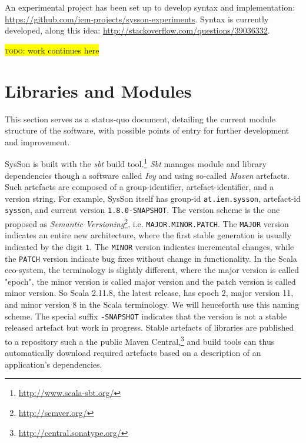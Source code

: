 \documentclass[11pt,a4paper]{article}
\newcommand{\todo}[1]{\colorbox{yellow}{\textsc{todo}: #1}}
\newcommand{\software}[1]{\textit{#1}}
\newcommand{\sysson}[0]{SysSon}
\begin{document}
An experimental project has been set up to develop syntax and implementation: \url{https://github.com/iem-projects/sysson-experiments}. Syntax is currently developed, along this idea: \url{http://stackoverflow.com/questions/39036332}.

\todo{work continues here}

\section{Libraries and Modules}

This section serves as a status-quo document, detailing the current module structure of the software, with possible points of entry for further development and improvement.

\sysson{} is built with the \software{sbt} build tool.\footnote{\url{http://www.scala-sbt.org/}} \software{Sbt} manages module and library dependencies though a software called \software{Ivy} and using so-called \software{Maven} artefacts. Such artefacts are composed of a group-identifier, artefact-identifier, and a version string. For example, \sysson{} itself has group-id \verb!at.iem.sysson!, artefact-id \verb!sysson!, and current version \verb!1.8.0-SNAPSHOT!. The version scheme is the one proposed as \emph{Semantic Versioning}\footnote{\url{http://semver.org/}}, i.e. \verb!MAJOR.MINOR.PATCH!. The \verb!MAJOR! version indicates an entire new architecture, where the first stable generation is usually indicated by the digit \verb!1!. The \verb!MINOR! version indicates incremental changes, while the \verb!PATCH! version indicate bug fixes without change in functionality. In the Scala eco-system, the terminology is slightly different, where the major version is called "epoch", the minor version is called major version and the patch version is called minor version. So Scala 2.11.8, the latest release, has epoch 2, major version 11, and minor version 8 in the Scala terminology. We will henceforth use this naming scheme. The special suffix \verb!-SNAPSHOT! indicates that the version is not a stable released artefact but work in progress. Stable artefacts of libraries are published to a repository such a the public Maven Central,\footnote{\url{http://central.sonatype.org/}} and build tools can thus automatically download required artefacts based on a description of an application's dependencies.
\end{document}

